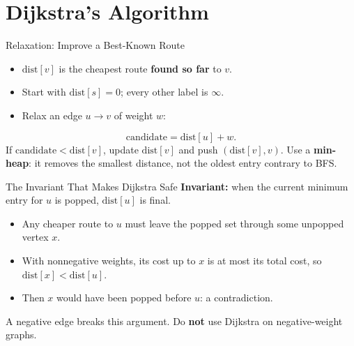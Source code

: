 \documentclass{beamer}
\begin{document}
\section{Dijkstra's Algorithm}

\begin{frame}{Relaxation: Improve a Best-Known Route}
  \begin{itemize}
    \item $\mathrm{dist}[v]$ is the cheapest route \textbf{found so far} to $v$.
    \item Start with $\mathrm{dist}[s]=0$; every other label is $\infty$.
    \item Relax an edge $u\to v$ of weight $w$:
  \end{itemize}
  \[
    \mathrm{candidate}=\mathrm{dist}[u]+w.
  \]
  If $\mathrm{candidate}<\mathrm{dist}[v]$, update $\mathrm{dist}[v]$ and push $(\mathrm{dist}[v],v)$.
  \medskip
  Use a \textbf{min-heap}: it removes the smallest distance, not the oldest entry contrary to BFS.
\end{frame}

\begin{frame}{The Invariant That Makes Dijkstra Safe}
  \textbf{Invariant:} when the current minimum entry for $u$ is popped, $\mathrm{dist}[u]$ is final.
  \begin{itemize}
    \item Any cheaper route to $u$ must leave the popped set through some unpopped vertex $x$.
    \item With nonnegative weights, its cost up to $x$ is at most its total cost, so $\mathrm{dist}[x]<\mathrm{dist}[u]$.
    \item Then $x$ would have been popped before $u$: a contradiction.
  \end{itemize}
  \medskip
  A negative edge breaks this argument. Do \textbf{not} use Dijkstra on negative-weight graphs.
\end{frame}
\end{document}
